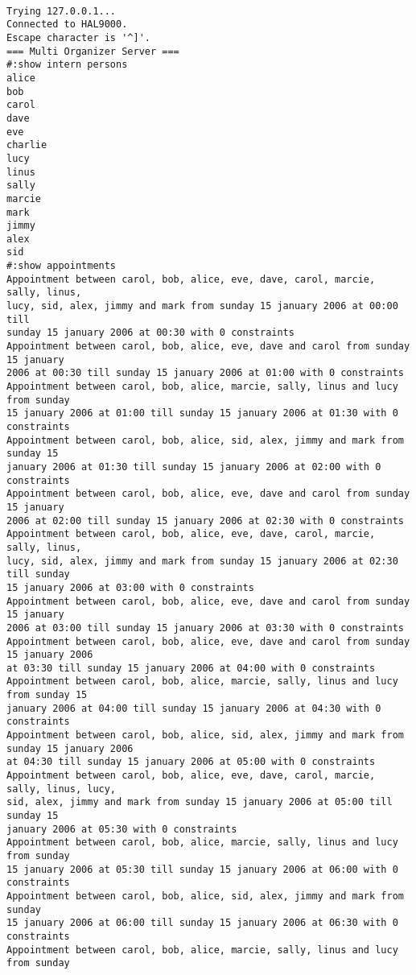 \documentclass[a4paper]{article}
\begin{document}
\begin{verbatim}

Trying 127.0.0.1...
Connected to HAL9000.
Escape character is '^]'.
=== Multi Organizer Server ===
#:show intern persons
alice
bob
carol
dave
eve
charlie
lucy
linus
sally
marcie
mark
jimmy
alex
sid
#:show appointments
Appointment between carol, bob, alice, eve, dave, carol, marcie, sally, linus, 
lucy, sid, alex, jimmy and mark from sunday 15 january 2006 at 00:00 till 
sunday 15 january 2006 at 00:30 with 0 constraints 
Appointment between carol, bob, alice, eve, dave and carol from sunday 15 january 
2006 at 00:30 till sunday 15 january 2006 at 01:00 with 0 constraints 
Appointment between carol, bob, alice, marcie, sally, linus and lucy from sunday 
15 january 2006 at 01:00 till sunday 15 january 2006 at 01:30 with 0 constraints 
Appointment between carol, bob, alice, sid, alex, jimmy and mark from sunday 15 
january 2006 at 01:30 till sunday 15 january 2006 at 02:00 with 0 constraints 
Appointment between carol, bob, alice, eve, dave and carol from sunday 15 january 
2006 at 02:00 till sunday 15 january 2006 at 02:30 with 0 constraints 
Appointment between carol, bob, alice, eve, dave, carol, marcie, sally, linus, 
lucy, sid, alex, jimmy and mark from sunday 15 january 2006 at 02:30 till sunday 
15 january 2006 at 03:00 with 0 constraints 
Appointment between carol, bob, alice, eve, dave and carol from sunday 15 january 
2006 at 03:00 till sunday 15 january 2006 at 03:30 with 0 constraints 
Appointment between carol, bob, alice, eve, dave and carol from sunday 15 january 2006 
at 03:30 till sunday 15 january 2006 at 04:00 with 0 constraints 
Appointment between carol, bob, alice, marcie, sally, linus and lucy from sunday 15 
january 2006 at 04:00 till sunday 15 january 2006 at 04:30 with 0 constraints 
Appointment between carol, bob, alice, sid, alex, jimmy and mark from sunday 15 january 2006 
at 04:30 till sunday 15 january 2006 at 05:00 with 0 constraints 
Appointment between carol, bob, alice, eve, dave, carol, marcie, sally, linus, lucy, 
sid, alex, jimmy and mark from sunday 15 january 2006 at 05:00 till sunday 15 
january 2006 at 05:30 with 0 constraints 
Appointment between carol, bob, alice, marcie, sally, linus and lucy from sunday 
15 january 2006 at 05:30 till sunday 15 january 2006 at 06:00 with 0 constraints 
Appointment between carol, bob, alice, sid, alex, jimmy and mark from sunday 
15 january 2006 at 06:00 till sunday 15 january 2006 at 06:30 with 0 constraints 
Appointment between carol, bob, alice, marcie, sally, linus and lucy from sunday 

\end{verbatim}
\end{document}
